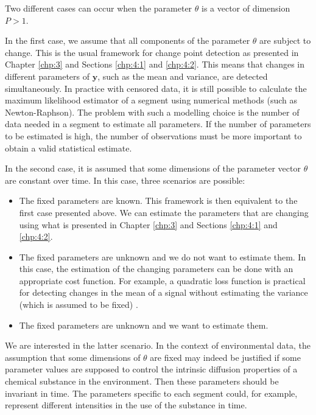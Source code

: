 Two different cases can occur when the parameter $\theta$ is a vector of dimension $P > 1$.  

In the first case, we assume that all components of the parameter $\theta$ are subject to change. This is the usual framework for change point detection as presented in Chapter \ref{chp:3} and Sections \ref{chp:4:1} and \ref{chp:4:2}. This means that changes in different parameters of $\bm y$, such as the mean and variance, are detected simultaneously. In practice with censored data, it is still possible to calculate the maximum likelihood estimator of a segment using numerical methods (such as Newton-Raphson). The problem with such a modelling choice is the number of data needed in a segment to estimate all parameters. If the number of parameters to be estimated is high, the number of observations must be more important to obtain a valid statistical estimate. 


In the second case, it is assumed that some dimensions of the parameter vector $\theta$ are constant over time. In this case, three scenarios are possible: 
\begin{itemize}
\item The fixed parameters are known. This framework is then equivalent to the first case presented above. We can estimate the parameters that are changing using what is presented in Chapter \ref{chp:3} and Sections \ref{chp:4:1} and \ref{chp:4:2}. 
\item The fixed parameters are unknown and we do not want to estimate them. In this case, the estimation of the changing parameters can be done with an appropriate cost function. For example, a quadratic loss function is practical for detecting changes in the mean of a signal without estimating the variance (which is assumed to be fixed) \citep{Fearnhead2018a}.
\item  The fixed parameters are unknown and we want to estimate them.
\end{itemize}

We are interested in the latter scenario. In the context of environmental data, the assumption that some dimensions of $\theta$ are fixed may indeed be justified if some parameter values are supposed to control the intrinsic diffusion properties of a chemical substance in the environment. Then these parameters should be invariant in time. The parameters specific to each segment could, for example, represent different intensities in the use of the substance in time. 

